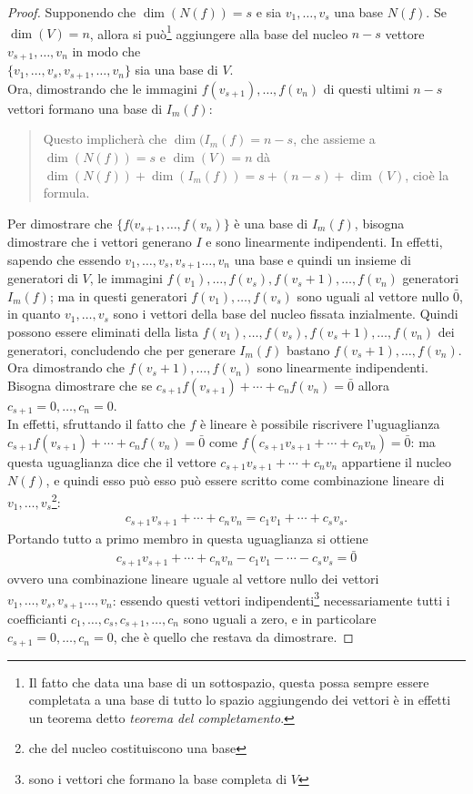 \begin{proof}
  Supponendo che $\dim(N(f))=s$ e sia $v_1,\dots,v_s$ una base $N(f)$. Se $\dim(V)=n$, allora si
  può\footnote{Il fatto che data una base di un sottospazio, questa possa sempre essere completata
    a una base di tutto lo spazio aggiungendo dei vettori è in effetti un teorema detto \emph{teorema
      del completamento}.} aggiungere alla base del nucleo $n-s$ vettore $v_{s+1},\dots,v_n$ in modo
  che\\ $\{v_1,\dots,v_s,v_{s+1},\dots,v_n\}$ sia una base di $V$.\\
  Ora, dimostrando che le immagini $f(v_{s+1}),\dots,f(v_n)$ di questi ultimi $n-s$ vettori formano una
  base di $I_m(f)$:
  \begin{quote}
    Questo implicherà che $\dim(I_m(f)=n-s$, che assieme a $\dim(N(f))=s$ e $\dim(V)=n$ dà $\dim(N(f))+
    \dim(I_m(f))=s+(n-s)+\dim(V)$, cioè la formula.
  \end{quote}
  Per dimostrare che $\{f(v_{s+1},\dots,f(v_n)\}$ è una base di $I_m(f)$, bisogna dimostrare che i
  vettori generano $I$ e sono linearmente indipendenti. In effetti, sapendo che essendo $v_1,\dots,v_s,
  v_{s+1}\dots, v_n$ una base e quindi un insieme di generatori di $V$, le immagini $f(v_1),\dots,f(v_s),
  f(v_s+1),\dots,f(v_n)$ generatori $I_m(f)$; ma in questi generatori $f(v_1),\dots,f(v_s)$ sono uguali
  al vettore nullo $\bar{0}$, in quanto $v_1,\dots,v_s$ sono i vettori della base del nucleo fissata
  inzialmente. Quindi possono essere eliminati della lista $f(v_1),\dots,f(v_s), f(v_s+1),\dots,f(v_n)$
  dei generatori, concludendo che per generare $I_m(f)$ bastano $f(v_s+1),\dots,f(v_n)$.\\
  Ora dimostrando che $f(v_s+1),\dots,f(v_n)$ sono linearmente indipendenti. Bisogna dimostrare che se
  $c_{s+1}f(v_{s+1})+\cdots+c_nf(v_n)=\bar{0}$ allora $c_{s+1}=0,\dots,c_n=0$.\\
  In effetti, sfruttando il fatto che $f$ è lineare è possibile riscrivere l'uguaglianza
  $c_{s+1}f(v_{s+1})+\cdots+c_nf(v_n)=\bar{0}$ come $f(c_{s+1}v_{s+1}+\cdots+c_nv_n)=\bar{0}$: ma questa
  uguaglianza dice che il vettore $c_{s+1}v_{s+1}+\cdots+c_nv_n$ appartiene il nucleo $N(f)$, e quindi
  esso può esso può essere scritto come combinazione lineare di $v_1,\dots,v_s$\footnote{che
    del nucleo costituiscono una base}:
  \begin{eqnarray*}
    c_{s+1}v_{s+1}+\cdots+c_nv_n=c_1v_1+\cdots+c_sv_s.
  \end{eqnarray*}
  Portando tutto a primo membro in questa uguaglianza si ottiene
  \begin{eqnarray*}
    c_{s+1}v_{s+1}+\cdots+c_nv_n-c_1v_1-\cdots-c_sv_s=\bar{0}
  \end{eqnarray*}
  ovvero una combinazione lineare uguale al vettore nullo dei vettori $v_1,\dots,v_s, v_{s+1}\dots, v_n$:
  essendo questi vettori indipendenti\footnote{sono i vettori che formano la base completa di $V$}
  necessariamente tutti i coefficianti $c_1,\dots,c_s,c_{s+1},\dots,c_n$ sono uguali a zero, e in
  particolare $c_{s+1}=0,\dots,c_n=0$, che è quello che restava da dimostrare.
\end{proof}
